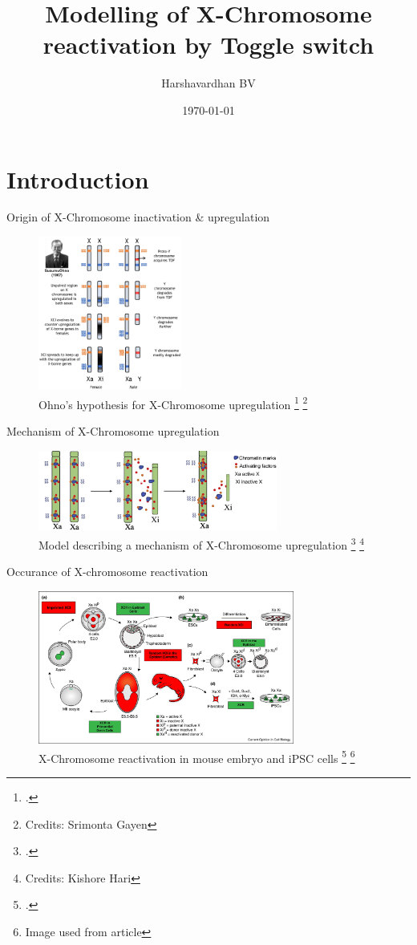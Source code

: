 \documentclass[aspectratio=169,9pt]{beamer}
\title{Modelling of X-Chromosome reactivation by Toggle switch}
\author{Harshavardhan BV}
\date{\today}
\institute{IISc Bangalore}
\begin{document}
    \frame{\titlepage}

    \section{Introduction}
    \begin{frame}{Origin of X-Chromosome inactivation \& upregulation}
        \begin{figure}
            \centering
            \includegraphics[width=0.42\textwidth]{ohno}
            \caption{Ohno's hypothesis for X-Chromosome upregulation \footcite{ohno} \footnote{Credits: Srimonta Gayen}}
        \end{figure}
    \end{frame}

    \begin{frame}{Mechanism of X-Chromosome upregulation}
        \begin{figure}
            \centering
            \includegraphics[width=0.7\textwidth]{xcu}
            \caption{Model describing a mechanism of X-Chromosome upregulation \footcite{xcu} \footnote{Credits: Kishore Hari}}
        \end{figure}
    \end{frame}

    \begin{frame}{Occurance of X-chromosome reactivation}
        \begin{figure}
            \centering
            \includegraphics[width=0.75\textwidth]{xcr}
            \caption{X-Chromosome reactivation in mouse embryo and iPSC cells \footcite{xcr} \footnote{Image used from article}}
        \end{figure}
    \end{frame}
\end{document}
